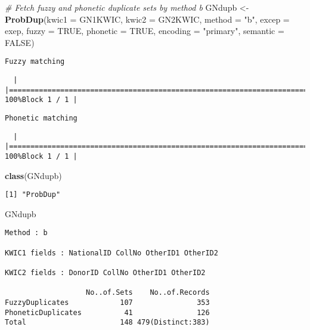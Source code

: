 \documentclass[
]{article}
\newenvironment{Shaded}{\begin{snugshade}}{\end{snugshade}}
\newcommand{\CommentTok}[1]{\textcolor[rgb]{0.56,0.35,0.01}{\textit{#1}}}
\newcommand{\DataTypeTok}[1]{\textcolor[rgb]{0.13,0.29,0.53}{#1}}
\newcommand{\KeywordTok}[1]{\textcolor[rgb]{0.13,0.29,0.53}{\textbf{#1}}}
\newcommand{\NormalTok}[1]{#1}
\newcommand{\OtherTok}[1]{\textcolor[rgb]{0.56,0.35,0.01}{#1}}
\newcommand{\StringTok}[1]{\textcolor[rgb]{0.31,0.60,0.02}{#1}}
\begin{document}
\begin{Shaded}
\begin{Highlighting}[]
\CommentTok{# Fetch fuzzy and phonetic duplicate sets by method b}
\NormalTok{GNdupb <-}\StringTok{ }\KeywordTok{ProbDup}\NormalTok{(}\DataTypeTok{kwic1 =}\NormalTok{ GN1KWIC, }\DataTypeTok{kwic2 =}\NormalTok{ GN2KWIC, }\DataTypeTok{method =} \StringTok{"b"}\NormalTok{,}
                  \DataTypeTok{excep =}\NormalTok{ exep, }\DataTypeTok{fuzzy =} \OtherTok{TRUE}\NormalTok{, }\DataTypeTok{phonetic =} \OtherTok{TRUE}\NormalTok{,}
                  \DataTypeTok{encoding =} \StringTok{"primary"}\NormalTok{, }\DataTypeTok{semantic =} \OtherTok{FALSE}\NormalTok{)}
\end{Highlighting}
\end{Shaded}

\begin{verbatim}
Fuzzy matching
\end{verbatim}

\begin{verbatim}
  |                                                                                    |============================================================================| 100%Block 1 / 1 |
\end{verbatim}

\begin{verbatim}
Phonetic matching
\end{verbatim}

\begin{verbatim}
  |                                                                                    |============================================================================| 100%Block 1 / 1 |
\end{verbatim}

\begin{Shaded}
\begin{Highlighting}[]
\KeywordTok{class}\NormalTok{(GNdupb)}
\end{Highlighting}
\end{Shaded}

\begin{verbatim}
[1] "ProbDup"
\end{verbatim}

\begin{Shaded}
\begin{Highlighting}[]
\NormalTok{GNdupb}
\end{Highlighting}
\end{Shaded}

\begin{verbatim}
Method : b

KWIC1 fields : NationalID CollNo OtherID1 OtherID2

KWIC2 fields : DonorID CollNo OtherID1 OtherID2
 
                   No..of.Sets    No..of.Records
FuzzyDuplicates            107               353
PhoneticDuplicates          41               126
Total                      148 479(Distinct:383)
\end{verbatim}
\end{document}
